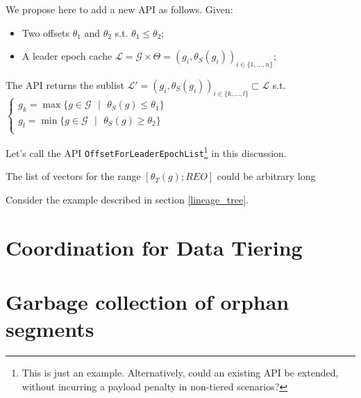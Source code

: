 \documentclass{article}
\begin{document}
We propose here to add a new API as follows. Given:

\begin{itemize}
\item Two offsets $\theta_1$ and $\theta_2$ s.t. $\theta_1 \leq \theta_2$;
\item A leader epoch cache $\mathcal{L}=\mathcal{G}\times\Theta=(g_i, \theta_S(g_i))_{i \in \{1,...,n\}}$;
\end{itemize}

The API returns the sublist $\mathcal{L'}=(g_i, \theta_S(g_i))_{i \in \{k,...,l\}} \sqsubset \mathcal{L}$ s.t. $\left\{
\begin{array}{l}
g_k=\max \texttt{} \{g \in \mathcal{G} \texttt{ } | \texttt{ } \theta_S(g) \leq \theta_1\}\\
g_l=\min \texttt{} \{g \in \mathcal{G} \texttt{ } | \texttt{ } \theta_S(g) \geq \theta_2\}\\
\end{array}
\right.$

Let's call the API \texttt{OffsetForLeaderEpochList}\footnote{This is just an example. Alternatively, could an existing API be extended, without incurring a payload penalty in non-tiered scenarios?} in this discussion.



The list of vectors for the range $[\theta_T(g); REO]$ could be arbitrary long


Consider the example described in section \ref{lineage_tree}. 

\newpage
\section{Coordination for Data Tiering}

\newpage
\section{Garbage collection of orphan segments}

\newpage

{}
\end{document}
